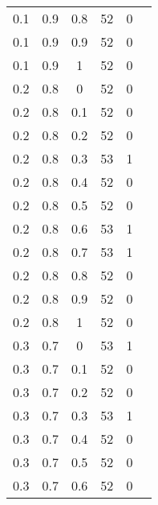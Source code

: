 \begin{table}
\begin{minipage}[h!]{0.10\hsize}
\begin{center}
{\begin{tabular}{|c@{\hspace{5mm}}|c@{\hspace{5mm}}|c@{\hspace{5mm}}|c@{\hspace{5mm}}|c@{\hspace{5mm}}|c|}
                    0.1  & 0.9  & 0.8  & 52    & 0     \\
                    0.1  & 0.9  & 0.9  & 52    & 0     \\
                    0.1  & 0.9  & 1    & 52    & 0     \\
                    0.2  & 0.8  & 0    & 52    & 0     \\
                    0.2  & 0.8  & 0.1  & 52    & 0     \\
                    0.2  & 0.8  & 0.2  & 52    & 0     \\
                    0.2  & 0.8  & 0.3  & 53    & 1     \\
                    0.2  & 0.8  & 0.4  & 52    & 0     \\
                    0.2  & 0.8  & 0.5  & 52    & 0     \\
                    0.2  & 0.8  & 0.6  & 53    & 1     \\
                    0.2  & 0.8  & 0.7  & 53    & 1     \\
                    0.2  & 0.8  & 0.8  & 52    & 0     \\
                    0.2  & 0.8  & 0.9  & 52    & 0     \\
                    0.2  & 0.8  & 1    & 52    & 0     \\
                    0.3  & 0.7  & 0    & 53    & 1     \\
                    0.3  & 0.7  & 0.1  & 52    & 0     \\
                    0.3  & 0.7  & 0.2  & 52    & 0     \\
                    0.3  & 0.7  & 0.3  & 53    & 1     \\
                    0.3  & 0.7  & 0.4  & 52    & 0     \\
                    0.3  & 0.7  & 0.5  & 52    & 0     \\
                    0.3  & 0.7  & 0.6  & 52    & 0     \\
                \end{tabular}}
                \label{tab:log1}
        \end{center}
    \end{minipage}
    \hfill
    \begin{minipage}[!h]{0.50\hsize}\centering
        \begin{center}
\end{center}
\end{minipage}
\end{table}
